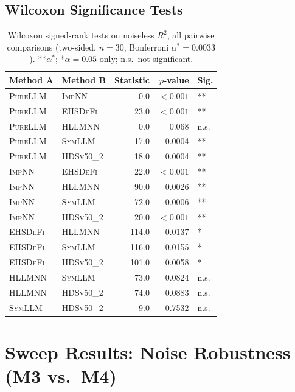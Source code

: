 \documentclass[twoside,11pt]{article}
\newcommand{\PureLLM}{\textsc{PureLLM}}
\newcommand{\INN}{\textsc{ImpNN}}
\newcommand{\EHD}{\textsc{EHSDeFi}}
\newcommand{\HSL}{\textsc{HLLMNN}}
\newcommand{\SEL}{\textsc{SymLLM}}
\newcommand{\HDS}{\textsc{HDSv50\_2}}
\newcommand{\Rsq}{R^{2}}
\begin{document}
\subsection{Wilcoxon Significance Tests}
\label{sec:noiseless:wilcoxon}

\begin{table}[ht]
\centering
\caption{Wilcoxon signed-rank tests on noiseless $\Rsq$, all pairwise
         comparisons (two-sided, $n=30$, Bonferroni $\alpha^*=0.0033$).
         **$\alpha^*$; *$\alpha=0.05$ only; n.s.~not significant.}
\label{tab:wilcoxon}
\small
\begin{tabular}{llrrl}
\toprule
\textbf{Method A} & \textbf{Method B} & \textbf{Statistic} &
  \textbf{$p$-value} & \textbf{Sig.} \\
\midrule
\PureLLM & \INN  &   0.0 & $<0.001$ & ** \\
\PureLLM & \EHD  &  23.0 & $<0.001$ & ** \\
\PureLLM & \HSL  &   0.0 &  0.068   & n.s. \\
\PureLLM & \SEL  &  17.0 &  0.0004  & ** \\
\PureLLM & \HDS  &  18.0 &  0.0004  & ** \\
\midrule
\INN     & \EHD  &  22.0 & $<0.001$ & ** \\
\INN     & \HSL  &  90.0 &  0.0026  & ** \\
\INN     & \SEL  &  72.0 &  0.0006  & ** \\
\INN     & \HDS  &  20.0 & $<0.001$ & ** \\
\midrule
\EHD     & \HSL  & 114.0 &  0.0137  & *  \\
\EHD     & \SEL  & 116.0 &  0.0155  & *  \\
\EHD     & \HDS  & 101.0 &  0.0058  & *  \\
\midrule
\HSL     & \SEL  &  73.0 &  0.0824  & n.s. \\
\HSL     & \HDS  &  74.0 &  0.0883  & n.s. \\
\SEL     & \HDS  &   9.0 &  0.7532  & n.s. \\
\bottomrule
\end{tabular}
\end{table}

\section{Sweep Results: Noise Robustness (M3 vs.\ M4)}
\label{sec:noise}
\end{document}
